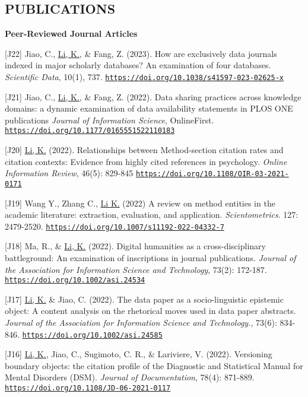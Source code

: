 \documentclass[margin, 10pt]{res} %
\begin{document}
\begin{resume}
\section{PUBLICATIONS}

\textbf{Peer-Reviewed Journal Articles}

[J22] Jiao, C., \underline{Li, K.}, \& Fang, Z. (2023). How are exclusively data journals indexed in major scholarly databases? An examination of four databases. \textit{Scientific Data}, 10(1), 737. \href{https://doi.org/10.1038/s41597-023-02625-x}{\nolinkurl{https://doi.org/10.1038/s41597-023-02625-x}}

[J21] Jiao, C., \underline{Li, K.}, \& Fang, Z. (2022). Data sharing practices across knowledge domains: a dynamic examination of data availability statements in PLOS ONE publications \textit{Journal of Information Science}, OnlineFirst. \href{https://doi.org/10.1177/0165551522110183}{\nolinkurl{https://doi.org/10.1177/0165551522110183}} 

[J20] \underline{Li, K.} (2022). Relationships between Method-section citation rates and citation contexts: Evidence from highly cited references in psychology. \textit{Online Information Review}, 46(5): 829-845 \href{https://doi.org/10.1108/OIR-03-2021-0171}{\nolinkurl{https://doi.org/10.1108/OIR-03-2021-0171}} 

[J19] Wang Y., Zhang C., \underline{Li K.} (2022) A review on method entities in the academic literature: extraction, evaluation, and application. \textit{Scientometrics}. 127: 2479-2520. \href{https://doi.org/10.1007/s11192-022-04332-7}{\nolinkurl{https://doi.org/10.1007/s11192-022-04332-7}}

[J18] Ma, R., \& \underline{Li, K.} (2022). Digital humanities as a cross-disciplinary battleground: An examination of inscriptions in journal publications. \textit{Journal of the Association for Information Science and Technology}, 73(2): 172-187. \href{https://doi.org/10.1002/asi.24534}{\nolinkurl{https://doi.org/10.1002/asi.24534}}

[J17] \underline{Li, K.} \& Jiao, C. (2022). The data paper as a socio-linguistic epistemic object: A content analysis on the rhetorical moves used in data paper abstracts. \textit{Journal of the Association for Information Science and Technology.}, 73(6): 834-846. \href{https://doi.org/10.1002/asi.24585}{\nolinkurl{https://doi.org/10.1002/asi.24585}}

[J16] \underline{Li, K.}, Jiao, C., Sugimoto, C. R., \& Lariviere, V. (2022). Versioning boundary objects: the citation profile of the Diagnostic and Statistical Manual for Mental Disorders (DSM). \textit{Journal of Documentation}, 78(4): 871-889. \href{https://doi.org/10.1108/JD-06-2021-0117}{\nolinkurl{https://doi.org/10.1108/JD-06-2021-0117}}


\end{resume}
\end{document}

